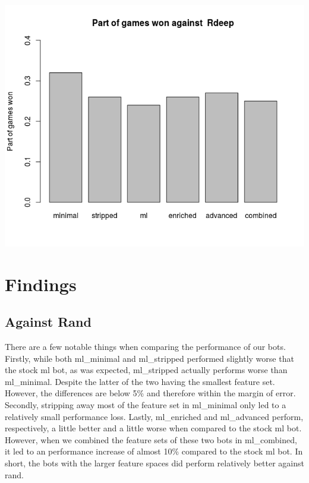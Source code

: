 \documentclass[a4paper,11pt]{article}
\begin{document}
\begin{center}
\begin{minipage}{0.49\linewidth}
\end{minipage}
      \\ %
\begin{minipage}{0.49\linewidth}
\includegraphics[width=\linewidth]{images/barplotRdeep.png}
\end{minipage}
\end{center}

\section{Findings}

\subsection*{Against Rand}
There are a few notable things when comparing the performance of our bots. Firstly, while both ml\_minimal and ml\_stripped performed slightly worse that the stock ml bot, as was expected, ml\_stripped actually performs worse than ml\_minimal. Despite the latter of the two having the smallest feature set. However, the differences are below 5\% and therefore within the margin of error. Secondly, stripping away most of the feature set in ml\_minimal only led to a relatively small performance loss. Lastly, ml\_enriched and ml\_advanced perform, respectively, a little better and a little worse when compared to the stock ml bot. However, when we combined the feature sets of these two bots in ml\_combined, it led to an performance increase of almost 10\% compared to the stock ml bot. In short, the bots with the larger feature spaces did perform relatively better against rand.
\end{document}

